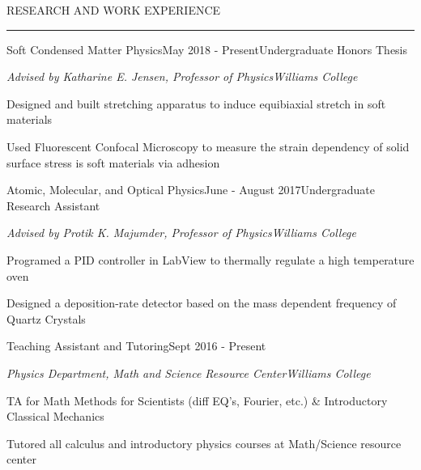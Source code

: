 \documentclass{short_resume} %
\renewenvironment{rSection}[1]{
	\sectionskip
	\textcolor{RoyalPurple}{\MakeUppercase{#1}}
	\sectionlineskip
	\hrule
	\begin{list}{}{
			\setlength{\leftmargin}{1.5em}
		}
		\item[]
	}{
	\end{list}
}
\begin{document}
	
	
		\vspace{-1em}

	
	\begin{rSection}{Research and Work Experience}
		
		\begin{rSubsection}{Soft Condensed Matter Physics}{May 2018 - Present}{Undergraduate Honors Thesis}{}
			\vspace{-.5em}
				\item[] {\em Advised by Katharine E. Jensen, Professor of Physics}\hfill {\em Williams College}
				\item Designed and built stretching apparatus to induce equibiaxial stretch in soft materials
				\item Used Fluorescent Confocal Microscopy to measure the strain dependency of solid surface stress is soft materials via adhesion
		\end{rSubsection}
%		
\vspace{-.5em}

		\begin{rSubsection}{Atomic, Molecular, and Optical Physics}{June - August 2017}{Undergraduate Research Assistant}{}
			\vspace{-.5em}
			\item[] {\em Advised by Protik K. Majumder, Professor of Physics}\hfill {\em Williams College}
			\item Programed a PID controller in LabView to thermally regulate a high temperature oven
			\item Designed a deposition-rate detector based on the mass dependent frequency of Quartz Crystals
		\end{rSubsection}
	
\vspace{-.5em}	
	
			\begin{rSubsection}{Teaching Assistant and Tutoring}{Sept 2016 - Present}{}{}
		\vspace{-.35em}
		\item[] {\em Physics Department, Math and Science Resource Center}\hfill {\em Williams College}
		\item TA for Math Methods for Scientists (diff EQ's, Fourier, etc.) \& Introductory Classical Mechanics
		\item Tutored all calculus and introductory physics courses at Math/Science resource center
	\end{rSubsection}


\end{rSection}
\end{document}
